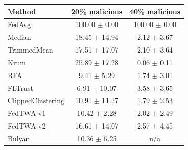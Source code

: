 \begin{tabular}{lcc}
\toprule
Method & 20\% malicious & 40\% malicious \\
\midrule
FedAvg & 100.00 $\pm$ 0.00 & 100.00 $\pm$ 0.00 \\
Median & 18.45 $\pm$ 14.94 & 2.12 $\pm$ 3.67 \\
TrimmedMean & 17.51 $\pm$ 17.07 & 2.10 $\pm$ 3.64 \\
Krum & 25.89 $\pm$ 17.28 & 0.06 $\pm$ 0.11 \\
RFA & 9.41 $\pm$ 5.29 & 1.74 $\pm$ 3.01 \\
FLTrust & 6.91 $\pm$ 10.07 & 3.58 $\pm$ 3.65 \\
ClippedClustering & 10.91 $\pm$ 11.27 & 1.79 $\pm$ 2.53 \\
FedTWA-v1 & 10.42 $\pm$ 2.28 & 2.02 $\pm$ 2.49 \\
FedTWA-v2 & 16.61 $\pm$ 14.07 & 2.57 $\pm$ 4.45 \\
Bulyan & 10.36 $\pm$ 6.25 & n/a \\
\bottomrule
\end{tabular}